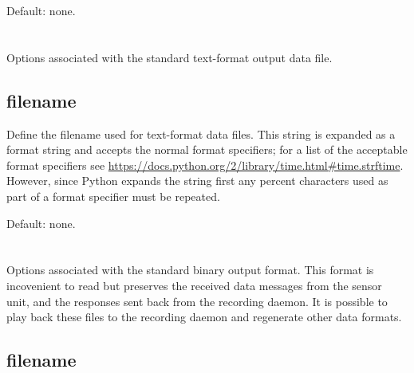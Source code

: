 Default: none.


\section{\code{[awnettextdata]}}

Options associated with the standard text-format output data file.

\subsection{filename}
\label{sec:config-data-filename}
Define the filename used for text-format data files. This string is
expanded as a  format string and accepts the normal
 format specifiers; for a list of the acceptable format
specifiers see
\url{https://docs.python.org/2/library/time.html#time.strftime}. However,
since Python expands the string first any percent characters used as
part of a  format specifier must be repeated.

Default: none.


\section{\code{[awpacket]}}
Options associated with the standard binary output format. This format is
incovenient to read but preserves the received data messages from the sensor
unit, and the responses sent back from the recording daemon. It is possible to
play back these files to the recording daemon and regenerate other data formats.

\subsection{filename}

